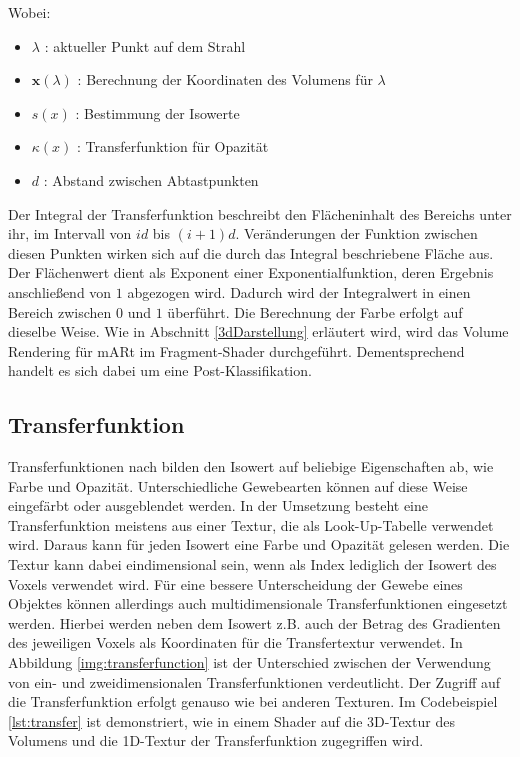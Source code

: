 Wobei:
\begin{itemize}
\item $\lambda$ 			: aktueller Punkt auf dem Strahl
\item $\mathbf{x}(\lambda)$ : Berechnung der Koordinaten des Volumens für $\lambda$
\item $s(x)$				: Bestimmung der Isowerte
\item $\kappa(x)$			: Transferfunktion für Opazität
\item $d$					: Abstand zwischen Abtastpunkten
\end{itemize}
 

Der Integral der Transferfunktion beschreibt den Flächeninhalt des Bereichs unter ihr, im Intervall von $id$ bis $(i+1)d$. Veränderungen der Funktion zwischen diesen Punkten wirken sich auf die durch das Integral beschriebene Fläche aus. 
Der Flächenwert dient als Exponent einer Exponentialfunktion, deren Ergebnis anschließend von $1$ abgezogen wird. Dadurch wird der Integralwert in einen Bereich zwischen $0$ und $1$ überführt. 
Die Berechnung der Farbe erfolgt auf dieselbe Weise.
Wie in Abschnitt \ref{3dDarstellung} erläutert wird, wird das Volume Rendering für mARt im Fragment-Shader durchgeführt. Dementsprechend handelt es sich dabei um eine Post-Klassifikation.

\subsection{Transferfunktion}

Transferfunktionen nach \cite{Fernando04} bilden den Isowert auf beliebige Eigenschaften ab, wie  Farbe und Opazität.  Unterschiedliche Gewebearten können auf diese Weise eingefärbt oder ausgeblendet werden. In der Umsetzung besteht eine Transferfunktion meistens aus einer Textur, die als Look-Up-Tabelle verwendet wird. Daraus kann für jeden Isowert eine Farbe und Opazität gelesen werden. Die Textur kann dabei eindimensional sein, wenn als Index lediglich der Isowert des Voxels verwendet wird. Für eine bessere Unterscheidung der Gewebe eines Objektes können allerdings auch multidimensionale Transferfunktionen eingesetzt werden. Hierbei werden neben dem Isowert z.B. auch der Betrag des Gradienten des jeweiligen Voxels als Koordinaten für die Transfertextur verwendet. In Abbildung \ref{img:transferfunction} ist der Unterschied zwischen der Verwendung von ein- und zweidimensionalen Transferfunktionen verdeutlicht. Der Zugriff auf die Transferfunktion erfolgt genauso wie bei anderen Texturen. Im Codebeispiel \ref{lst:transfer} ist demonstriert, wie in einem Shader auf die 3D-Textur des Volumens und die 1D-Textur der Transferfunktion zugegriffen wird. 

